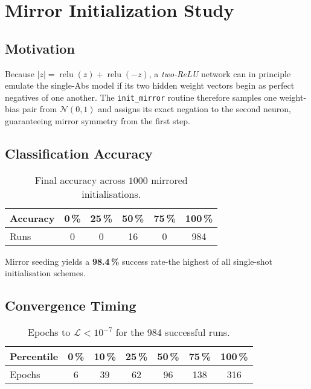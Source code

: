 \section{Mirror Initialization Study}
\label{sec:relu1-mirror}

\subsection*{Motivation}
Because \(|z| = \operatorname{relu}(z) + \operatorname{relu}(-z)\), a
\emph{two-ReLU} network can in principle emulate the single-Abs model if
its two hidden weight vectors begin as perfect negatives of one another.
The \texttt{init\_mirror} routine therefore samples one weight-bias pair
from \(\mathcal N(0,1)\) and assigns its exact negation to the second
neuron, guaranteeing mirror symmetry from the first step.

\subsection*{Classification Accuracy}

\begin{table}[h]
\centering
\caption{Final accuracy across $1000$ mirrored initialisations.}
\label{tab:relu1-mirror-accuracy}
\begin{tabular}{lccccc}
\toprule
Accuracy & 0\,\% & 25\,\% & 50\,\% & 75\,\% & 100\,\% \\
\midrule
Runs & 0 & 0 & 16 & 0 & 984 \\
\bottomrule
\end{tabular}
\end{table}

Mirror seeding yields a \textbf{98.4\,\%} success rate-the highest of
all single-shot initialisation schemes.

\subsection*{Convergence Timing}

\begin{table}[h]
\centering
\caption{Epochs to $\mathcal L<10^{-7}$ for the 984 successful runs.}
\label{tab:relu1-mirror-epochs}
\begin{tabular}{lcccccc}
\toprule
Percentile & 0\,\% & 10\,\% & 25\,\% & 50\,\% & 75\,\% & 100\,\% \\ \midrule
Epochs & 6 & 39 & 62 & 96 & 138 & 316 \\
\bottomrule
\end{tabular}
\end{table}


